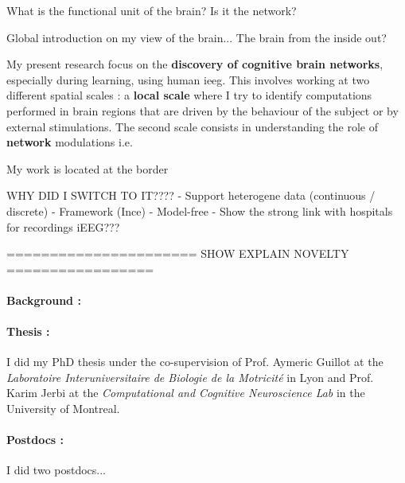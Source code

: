 \documentclass[a4paper,11pt]{article}
\begin{document}
\begin{multicols}{2}







What is the functional unit of the brain? Is it the network?

Global introduction on my view of the brain... The brain from the inside out?

My present research focus on the \textbf{discovery of cognitive brain networks}, especially during learning, using human \ac{ieeg}. This involves working at two different spatial scales : a \textbf{local scale} where I try to identify computations performed in brain regions that are driven by the behaviour of the subject or by external stimulations. The second scale consists in understanding the role of \textbf{network} modulations i.e.

My work is located at the border



WHY DID I SWITCH TO IT????
- Support heterogene data (continuous / discrete)
- Framework (Ince)
- Model-free
- Show the strong link with hospitals for recordings iEEG???

====================== SHOW EXPLAIN NOVELTY =================



\paragraph{Background :}

\paragraph{Thesis :} I did my PhD thesis under the co-supervision of Prof. Aymeric Guillot at the \textit{Laboratoire Interuniversitaire de Biologie de la Motricité} in Lyon and Prof. Karim Jerbi at the \textit{Computational and Cognitive Neuroscience Lab} in the University of Montreal.

\paragraph{Postdocs :} I did two postdocs...


\end{multicols}
\end{document}
